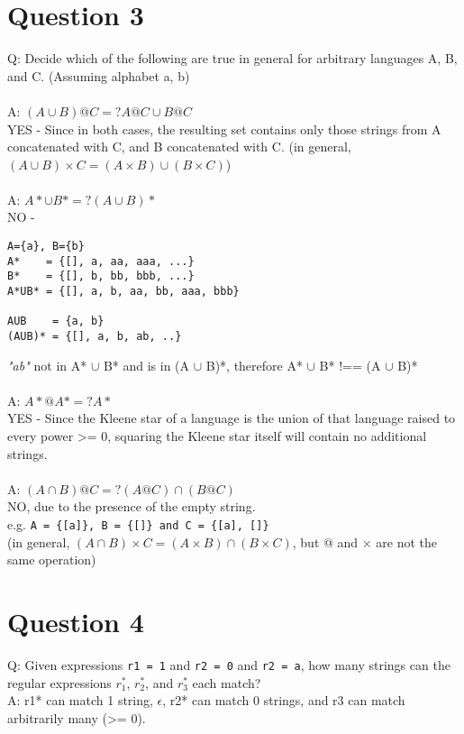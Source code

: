 \documentclass[english]{scrartcl}
\begin{document}
\section*{Question 3}
Q: Decide which of the following are true in general for arbitrary languages A, B, and C. (Assuming alphabet {a, b})
\\ \\
A: $(A \cup B)@C =? A@C \cup B@C$ \\
YES - Since in both cases, the resulting set contains only those strings from A concatenated with C, and B concatenated with C. (in general, $(A \cup B) \times C = (A \times B) \cup (B \times C)$)
\\ \\
A: $A* \cup B* =? (A \cup B)*$ \\
NO -
\begin{Verbatim}[mathescape,commandchars=\\\{\}]
A={a}, B={b}
A*    = {[], a, aa, aaa, ...}
B*    = {[], b, bb, bbb, ...}
A*UB* = {[], a, b, aa, bb, aaa, bbb}

AUB    = {a, b}
(AUB)* = {[], a, b, ab, ..}
\end{Verbatim}
\textit{"ab"} not in A* $\cup$ B* and is in (A $\cup$ B)*, therefore A* $\cup$ B* !== (A $\cup$ B)* \\
\\
A: $A*@A* =? A*$ \\
YES - Since the Kleene star of a language is the union of that language raised to every power >= 0, squaring the Kleene star itself will contain no additional strings.
\\ \\
A: $(A \cap B)@C =? (A@C)\cap(B@C)$ \\
NO, due to the presence of the empty string. \\
e.g. \verb|A = {[a]}, B = {[]} and C = {[a], []}| \\
(in general, $(A \cap B) \times C = (A \times B) \cap (B \times C)$, but @ and $\times$ are not the same operation)

\section*{Question 4}
Q: Given expressions \verb|r1 = 1| and \verb|r2 = 0| and \verb|r2 = a|,
how many strings can the regular expressions $r_1^*$, $r_2^*$, and $r_3^*$ each match?
\\
A: r1* can match 1 string, $\epsilon$, r2* can match 0 strings, and r3 can match arbitrarily many (>= 0).
\end{document}
